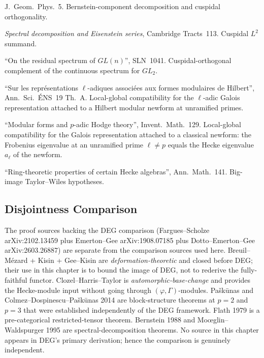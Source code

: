 \begin{description}
J.~Geom.~Phys.~5. Bernstein-component decomposition and
cuspidal orthogonality.
\item[Mo{\oe}glin--Waldspurger 1995] \emph{Spectral decomposition and
Eisenstein series}, Cambridge Tracts~113. Cuspidal \(L^{2}\) summand.
\item[Jacquet 1983] ``On the residual spectrum of \(GL(n)\)'',
SLN~1041. Cuspidal-orthogonal complement of the continuous spectrum
for \(GL_{2}\).
\item[Carayol 1986] ``Sur les repr{\'e}sentations \(\ell\)-adiques
associ{\'e}es aux formes modulaires de Hilbert'', Ann.~Sci.~\'ENS~19
Th.~A. Local-global compatibility for the \(\ell\)-adic Galois
representation attached to a Hilbert modular newform at unramified
primes.
\item[Saito 1997] ``Modular forms and \(p\)-adic Hodge theory'',
Invent.~Math.~129. Local-global compatibility for the Galois
representation attached to a classical newform: the Frobenius
eigenvalue at an unramified prime \(\ell \neq p\) equals the
Hecke eigenvalue \(a_{\ell}\) of the newform.
\item[Taylor--Wiles 1995] ``Ring-theoretic properties of certain
Hecke algebras'', Ann.~Math.~141. Big-image Taylor--Wiles
hypotheses.
\end{description}

\subsection{Disjointness Comparison}

The proof sources backing the DEG comparison
(Fargues--Scholze arXiv:2102.13459 plus Emerton--Gee arXiv:1908.07185
plus Dotto--Emerton--Gee arXiv:2603.26887) are separate from the
comparison sources used here. Breuil--M{\'e}zard + Kisin + Gee--Kisin
are \emph{deformation-theoretic} and closed before DEG; their use in
this chapter is to bound the image of DEG, not to rederive the
fully-faithful functor. Clozel--Harris--Taylor is
\emph{automorphic-base-change} and provides the Hecke-module input
without going through \((\varphi,\Gamma)\)-modules. Pa{\v
s}k{\=u}nas and Colmez--Dospinescu--Pa{\v s}k{\=u}nas 2014
are block-structure theorems at \(p=2\) and \(p=3\) that
were established independently of the DEG framework. Flath 1979 is a
pre-categorical restricted-tensor theorem. Bernstein 1988 and
Mo{\oe}glin--Waldspurger 1995 are spectral-decomposition theorems. No
source in this chapter appears in DEG's primary derivation; hence the
comparison is genuinely independent.


